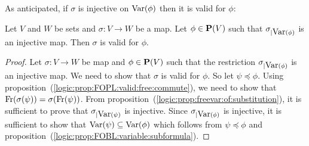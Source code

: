 As anticipated, if $\sigma$ is injective on $\mbox{\rm Var}(\phi)$ then it is
valid for $\phi$:

\begin{prop}\label{logic:prop:FOPL:valid:injective}
Let $V$ and $W$ be sets and $\sigma:V\to W$ be a map. Let
$\phi\in\mbox{${\bf P}(V)$}$ such that $\sigma_{|\mbox{\rm Var}(\phi)}$ is an injective map.
Then $\sigma$ is valid for $\phi$.
\end{prop}
\begin{proof}
Let $\sigma:V\to W$ be map and $\phi\in\mbox{${\bf P}(V)$}$ such that the
restriction $\sigma_{|\mbox{\rm Var}(\phi)}$ is an injective map. We need to
show that $\sigma$ is valid for $\phi$. So let $\psi\preceq\phi$.
Using proposition~(\ref{logic:prop:FOPL:valid:free:commute}), we
need to show that $\mbox{\rm Fr}(\sigma(\psi)) =\sigma(\mbox{\rm Fr}(\psi))$. From
proposition~(\ref{logic:prop:freevar:of:substitution}), it is
sufficient to prove that $\sigma_{|\mbox{\rm Var}(\psi)}$ is injective. Since
$\sigma_{|\mbox{\rm Var}(\phi)}$ is injective, it is sufficient to show that
$\mbox{\rm Var}(\psi)\subseteq\mbox{\rm Var}(\phi)$ which follows from $\psi\preceq\phi$
and proposition~(\ref{logic:prop:FOBL:variable:subformula}).
\end{proof}

